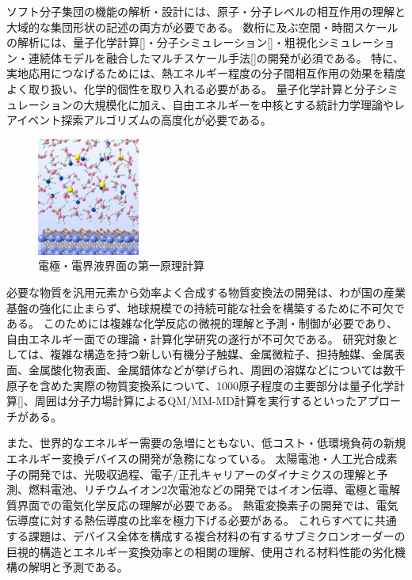 ソフト分子集団の機能の解析・設計には、原子・分子レベルの相互作用の理解と大域的な集団形状の記述の両方が必要である。
数桁に及ぶ空間・時間スケールの解析には、量子化学計算[]・分子シミュレーション[]・粗視化シミュレーション・連続体モデルを融合したマルチスケール手法[]の開発が必須である。
特に、実地応用につなげるためには、熱エネルギー程度の分子間相互作用の効果を精度よく取り扱い、化学的個性を取り入れる必要がある。
量子化学計算と分子シミュレーションの大規模化に加え、自由エネルギーを中核とする統計力学理論やレアイベント探索アルゴリズムの高度化が必要である。

\begin{figure}[H]
  \centering
  \includegraphics[width=0.3\textwidth]{figs/4-2_4.pdf}
  \caption{電極・電界液界面の第一原理計算}
  \label{fig:4-2_4}
\end{figure}

必要な物質を汎用元素から効率よく合成する物質変換法の開発は、わが国の産業基盤の強化に止まらず、地球規模での持続可能な社会を構築するために不可欠である。
このためには複雑な化学反応の微視的理解と予測・制御が必要であり、自由エネルギー面での理論・計算化学研究の遂行が不可欠である。
研究対象としては、複雑な構造を持つ新しい有機分子触媒、金属微粒子、担持触媒、金属表面、金属酸化物表面、金属錯体などが挙げられ、周囲の溶媒などについては数千原子を含めた実際の物質変換系について、1000原子程度の主要部分は量子化学計算[]、周囲は分子力場計算によるQM/MM-MD計算を実行するといったアプローチがある。

また、世界的なエネルギー需要の急増にともない、低コスト・低環境負荷の新規エネルギー変換デバイスの開発が急務になっている。
太陽電池・人工光合成素子の開発では、光吸収過程、電子/正孔キャリアーのダイナミクスの理解と予測、燃料電池、リチウムイオン2次電池などの開発ではイオン伝導、電極と電解質界面での電気化学反応の理解が必要である。
熱電変換素子の開発では、電気伝導度に対する熱伝導度の比率を極力下げる必要がある。
これらすべてに共通する課題は、デバイス全体を構成する複合材料の有するサブミクロンオーダーの巨視的構造とエネルギー変換効率との相関の理解、使用される材料性能の劣化機構の解明と予測である。

